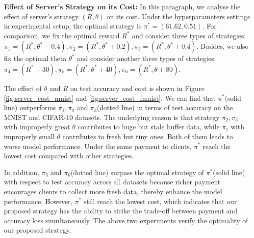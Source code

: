 \documentclass{article}
\theoremstyle{plain}
\theoremstyle{definition}
\theoremstyle{remark}
\begin{document}
\textbf{Effect of Server's Strategy on its Cost: }
In this paragraph, we analyse the effect of server's strategy $(R, \theta)$ on its cost.
Under the hyperparameters settings in experimental setup, the optimal strategy is $\pi^* = (61.62, 0.51)$.
For comparison, we fix the optimal reward $R^*$ and consider three types of strategies: $\pi_1=(R^*, \theta^*-0.4), \pi_2=(R^*, \theta^*+0.2), \pi_3=(R^*, \theta^*+0.4)$.
Besides, we also fix the optimal theta $\theta^*$ and consider another three types of strategies: $\pi_4=(R^* - 30), \pi_5=(R^*, \theta^*+40), \pi_6=(R^*, \theta+80)$.

The effect of $\theta$ and $R$ on test accuracy and cost is shown in Figure \ref{fig:server_cost_mnist} and \ref{fig:server_cost_fmnist}.
We can find that $\pi^*$(solid line) outperforms $\pi_1, \pi_2$ and $\pi_3$(dotted line) in terms of test accuracy on the MNIST and CIFAR-10 datasets. The underlying reason is that strategy $\pi_2, \pi_3$ with improperly great $\theta$ contributes to huge but stale buffer data, while $\pi_1$ with improperly small $\theta$ contributes to fresh but tiny ones. Both of them leads to worse model performance.
Under the same payment to clients, $\pi^*$ reach the lowest cost compared with other strategies.

In addition, $\pi_5$ and $\pi_6$(dotted line) surpass the optimal strategy of $\pi^*$(solid line) with respect to test accuracy across all datasets because richer payment encourages clients to collect more fresh data, thereby enhance the model performance.
However, $\pi^*$ still reach the lowest cost, which indicates that our proposed strategy has the ability to strike the trade-off between payment and accuracy loss simultaneously.
The above two experiments verify the optimality of our proposed strategy.
\end{document}

